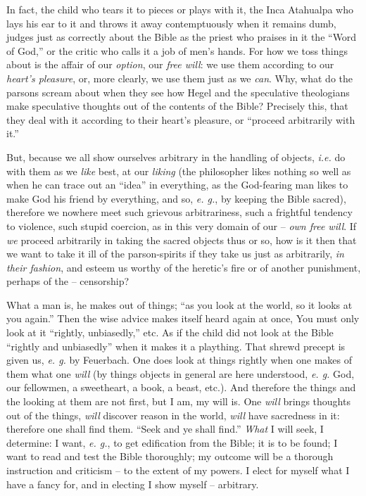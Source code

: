 \documentclass[12pt,a4paper]{book}
\begin{document}
In fact, the child who tears it to pieces or plays with it, the Inca Atahualpa 
who lays his ear to it and throws it away contemptuously when it remains dumb, 
judges just as correctly about the Bible as the priest who praises in it the 
``Word of God,'' or the critic who calls it a job of men's hands. For how we 
toss things about is the affair of our \textit{option}, our \textit{free 
will}: we use them according to our \textit{heart's pleasure}, or, more 
clearly, we use them just as we \textit{can}. Why, what do the parsons scream 
about when they see how Hegel and the speculative theologians make speculative 
thoughts out of the contents of the Bible? Precisely this, that they deal with 
it according to their heart's pleasure, or ``proceed arbitrarily with it.''

But, because we all show ourselves arbitrary in the handling of objects, 
\textit{i.e.} do with them as we \textit{like} best, at our \textit{liking} 
(the philosopher likes nothing so well as when he can trace out an ``idea'' 
in everything, as the God-fearing man likes to make God his friend by 
everything, and so, \textit{e. g.}, by keeping the Bible sacred), therefore we 
nowhere meet such grievous arbitrariness, such a frightful tendency to 
violence, such stupid coercion, as in this very domain of our -- \textit{own 
free will}. If \textit{we} proceed arbitrarily in taking the sacred objects 
thus or so, how is it then that we want to take it ill of the parson-spirits 
if they take us just as arbitrarily, \textit{in their fashion}, and esteem us 
worthy of the heretic's fire or of another punishment, perhaps of the -- 
censorship?

What a man is, he makes out of things; ``as you look at the world, so it 
looks at you again.'' Then the wise advice makes itself heard again at once, 
You must only look at it ``rightly, unbiasedly,'' etc. As if the child did 
not look at the Bible ``rightly and unbiasedly'' when it makes it a 
plaything. That shrewd precept is given us, \textit{e. g.} by Feuerbach. One 
does look at things rightly when one makes of them what one \textit{will} (by 
things objects in general are here understood, \textit{e. g.} God, our 
fellowmen, a sweetheart, a book, a beast, etc.). And therefore the things and 
the looking at them are not first, but I am, my will is. One \textit{will} 
brings thoughts out of the things, \textit{will} discover reason in the world, 
\textit{will} have sacredness in it: therefore one shall find them. ``Seek 
and ye shall find.'' \textit{What} I will seek, I determine: I want, 
\textit{e. g.}, to get edification from the Bible; it is to be found; I want 
to read and test the Bible thoroughly; my outcome will be a thorough 
instruction and criticism -- to the extent of my powers. I elect for myself 
what I have a fancy for, and in electing I show myself -- arbitrary.
\end{document}

